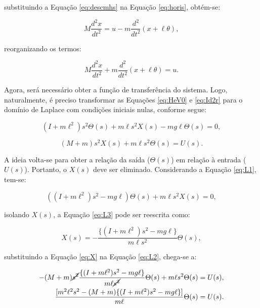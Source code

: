 \documentclass[12pt,           %
a4paper,                       %
openany,                       %
oneside,                       %
chapter=TITLE,                 %
english,                       %
spanish,                       %
brazil,                        %
sumario=tradicional]{abntex2}  %
\begin{document}
\begin{OnehalfSpace}
\noindent substituindo a Equação \ref{eq:descmhs} na Equação \ref{eq:horis}, obtém-se:

\begin{equation}
    M\frac{d^2x}{dt^2}  = u -  m\frac{d^2}{dt^2} (x + \ell\theta),
    \label{eq:Id2r}
\end{equation}

\noindent reorganizando os termos:

\begin{equation}
    M\frac{d^2x}{dt^2} + m\frac{d^2}{dt^2} (x + \ell\theta) = u.
    \label{eq:Id2r}
\end{equation}

Agora, será necessário obter a função de transferência do sistema. Logo, naturalmente, é preciso transformar as Equações \ref{eq:HeV0} e \ref{eq:Id2r} para o domínio de Laplace com condições iniciais nulas, conforme segue:

\begin{equation}
    (I + m\ell^2)s^2\Theta(s) + m\ell s^2 X(s) - mg\ell\Theta(s) = 0,
    \label{eq:L1}
\end{equation}

\begin{equation}
    (M+m)s^2 X(s) + m\ell s^2\Theta(s) = U(s).
    \label{eq:L2}
\end{equation}

A ideia volta-se para obter a relação da saída ($\Theta (s)$) em relação à entrada ($U(s)$). Portanto, o $X(s)$ deve ser eliminado. Considerando a Equação \ref{eq:L1}, tem-se:

\begin{equation}
    ((I + m\ell^2)s^2 - mg\ell)\Theta(s) + m\ell s^2 X(s) = 0,
    \label{eq:L3}
\end{equation}

\noindent isolando $X(s)$, a Equação \ref{eq:L3} pode ser reescrita como:

\begin{equation}
    X(s) = -\frac{\{(I+m\ell^2)s^2-mg\ell\}}{m\ell s^2} \Theta (s),
    \label{eq:X}
\end{equation}

\noindent substituindo a Equação \ref{eq:X} na Equação \ref{eq:L2}, chega-se a:

\begin{equation}
    \begin{split}
        -(M+m)\cancel{s^2} \frac{\{(I+m\ell^2)s^2-mg\ell\}}{m\ell \cancel{s^2}} \Theta (s) + m\ell s^2\Theta(s) = U(s),\\
        \frac{[m^2\ell^2 s^2 - (M+m)\{(I+m\ell^2)s^2-mg\ell\}]}{m\ell}\Theta (s) = U(s).
    \end{split}
    \label{eq:TF1}
\end{equation}


\end{OnehalfSpace}
\end{document}

